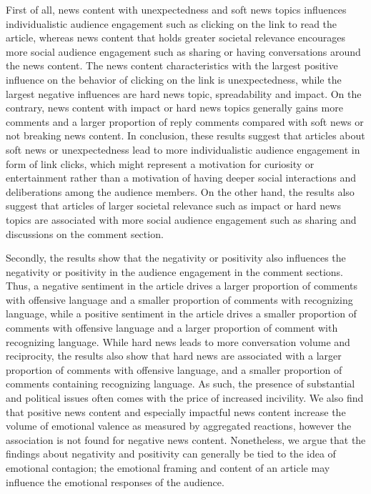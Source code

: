 \documentclass[
]{article}
\begin{document}
First of all, news content with unexpectedness and soft news topics
influences individualistic audience engagement such as clicking on the
link to read the article, whereas news content that holds greater
societal relevance encourages more social audience engagement such as
sharing or having conversations around the news content. The news
content characteristics with the largest positive influence on the
behavior of clicking on the link is unexpectedness, while the largest
negative influences are hard news topic, spreadability and impact. On
the contrary, news content with impact or hard news topics generally
gains more comments and a larger proportion of reply comments compared
with soft news or not breaking news content. In conclusion, these
results suggest that articles about soft news or unexpectedness lead to
more individualistic audience engagement in form of link clicks, which
might represent a motivation for curiosity or entertainment rather than
a motivation of having deeper social interactions and deliberations
among the audience members. On the other hand, the results also suggest
that articles of larger societal relevance such as impact or hard news
topics are associated with more social audience engagement such as
sharing and discussions on the comment section.

Secondly, the results show that the negativity or positivity also
influences the negativity or positivity in the audience engagement in
the comment sections. Thus, a negative sentiment in the article drives a
larger proportion of comments with offensive language and a smaller
proportion of comments with recognizing language, while a positive
sentiment in the article drives a smaller proportion of comments with
offensive language and a larger proportion of comment with recognizing
language. While hard news leads to more conversation volume and
reciprocity, the results also show that hard news are associated with a
larger proportion of comments with offensive language, and a smaller
proportion of comments containing recognizing language. As such, the
presence of substantial and political issues often comes with the price
of increased incivility. We also find that positive news content and
especially impactful news content increase the volume of emotional
valence as measured by aggregated reactions, however the association is
not found for negative news content. Nonetheless, we argue that the
findings about negativity and positivity can generally be tied to the
idea of emotional contagion; the emotional framing and content of an
article may influence the emotional responses of the audience.
\end{document}
